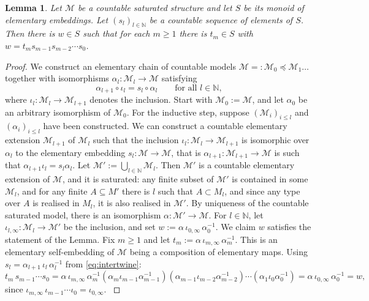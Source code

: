 \documentclass{article}
\newtheorem{lemma}[theorem]{Lemma}
\theoremstyle{remark}
\theoremstyle{definition}
\newcommand{\M}[0]{\mathcal{M}}
\renewcommand\leq{\leqslant}
\renewcommand\geq{\geqslant}
\begin{document}
{{{{{   \begin{lemma}\label{many divisors}
  	Let $\M$ be a countable saturated structure and let $S$ be its monoid of elementary embeddings.
    Let $(s_{l})_{l\in\mathbb{N}}$  be a countable sequence of elements  of $S$. Then there is $w\in S$ such that for each $m\geq 1$ there is $t_m\in S$ with $w=t_{m}s_{m-1}s_{m-2}\cdots s_{0}$.  
  \end{lemma}
  \begin{proof}
   {We construct an elementary chain of countable models $\M=:\M_{0}\preceq \M_{1}\dots $ together with isomorphisms $\alpha_{l}:\M_{l}\to\M$ satisfying 
   \begin{equation}\label{eq:intertwine}
    \alpha_{l+1} \circ \iota_l = s_l \circ \alpha_l
    \qquad \text{for all } l \in \mathbb{N},
  \end{equation}
  where $\iota_l \colon \M_l \to \M_{l+1}$ denotes the inclusion. %
   Start with
  $\M_0 := \M$, and let $\alpha_0 $  be an arbitrary isomorphism of $\M_0$. For the inductive step, suppose $(\M_i)_{i \leq l}$ and $(\alpha_i)_{i \leq l}$ have been constructed. We can construct a countable elementary extension $\M_{l+1}$ of $\M_l$ such that the inclusion $\iota_l:\mathcal{M}_l\to\mathcal{M}_{l+1}$ is isomorphic over  $\alpha_l$ to the elementary embedding $s_l: \mathcal{M}\to\mathcal{M}$, that is $\alpha_{l+1}:\M_{l+1}\to \M$ is such that $\alpha_{l+1}\iota_{l}=s_{l}\alpha_{l}$.
  Let $\M' := \bigcup_{l \in \mathbb{N}} \M_l$. Then $\M'$ is a countable   elementary extension of $\M$, and it is saturated: any finite subset of $\M'$  is contained in some $\M_l$,  and for any finite $A\subseteq M'$ there is $l$ such that $A\subset M_{l}$, and since any type over $A$ is realised in $M_{l}$, it is also realised in $\M'$.
  By uniqueness of the countable saturated model,
  there is an isomorphism $\alpha \colon \M' \to \M$.
  For $l \in \mathbb{N}$, let $\iota_{l,\infty} \colon \M_l \to \M'$ be the
  inclusion, and set $w := \alpha\, \iota_{0,\infty}\, \alpha_0^{-1}$. We claim
  $w$ satisfies the statement of the Lemma. Fix $m \geq 1$ and let
  $t_m := \alpha\, \iota_{m,\infty}\, \alpha_m^{-1}$. This is an elementary
  self-embedding of $\M$ being a composition of elementary maps. Using
  $s_l = \alpha_{l+1}\, \iota_l\, \alpha_l^{-1}$ from \eqref{eq:intertwine}:
  \begin{equation*}
    t_m\, s_{m-1} \cdots s_0
      = \alpha\, \iota_{m,\infty}\, \alpha_m^{-1}
        (\alpha_m \iota_{m-1} \alpha_{m-1}^{-1})
        (\alpha_{m-1} \iota_{m-2} \alpha_{m-2}^{-1})
        \cdots
        (\alpha_1 \iota_0 \alpha_0^{-1})
      = \alpha\, \iota_{0,\infty}\, \alpha_0^{-1}
      = w,
  \end{equation*}
  since $\iota_{m,\infty}\, \iota_{m-1} \cdots \iota_0 = \iota_{0,\infty}$.
}
  \end{proof}


}}}}}
\end{document}
